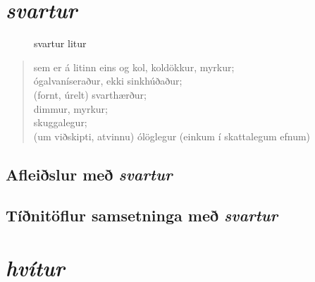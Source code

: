 \documentclass[12pt,b5paper,twosided,openany]{book}
\begin{document}
\begingroup
\renewcommand{\cleardoublepage}{}
\renewcommand{\clearpage}{}
	\tableofcontents
	\listoftables
	\listoffigures
\endgroup

\chapter{\textit{svartur}}
\label{kafli:svartur}

\begin{figure}[H]
\begin{tcolorbox}
	\centering
\end{tcolorbox}
	\caption{svartur litur}
	\label{mynd:svartur}
\end{figure}

\begin{quote}
	sem er á litinn eins og kol, koldökkur, myrkur; \\
	ógalvaníseraður, ekki sinkhúðaður; \\
	(fornt, úrelt) svarthærður;  \\
	dimmur, myrkur; \\
	skuggalegur; \\
	(um viðskipti, atvinnu) ólöglegur (einkum í skattalegum efnum)
\end{quote}

\section{Afleiðslur með \textit{svartur}}
\label{afl:svartafl}


\section{Tíðnitöflur samsetninga með \textit{svartur}}
\label{tidni:svartid}


\chapter{\textit{hvítur}}
\label{kafli:hvitur}
\end{document}
